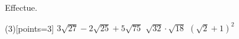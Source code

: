 %
%
    Effectue.
    \begin{tasks}(3)[points=3]
        \task \(3\sqrt{27} - 2\sqrt{25} + 5\sqrt{75}\)
        \task \(\sqrt{32}\cdot\sqrt{18}\)
        \task \(\left(\sqrt{2}+1\right)^2\)
    \end{tasks}
